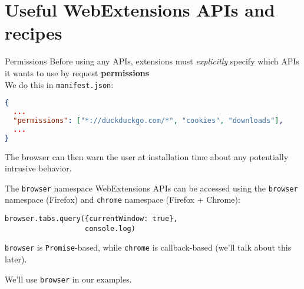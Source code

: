 \documentclass[../index.tex]{subfiles}
\begin{document}

\renewcommand{\sectiontitle}{Useful WebExtensions APIs and recipes}
\section{\sectiontitle}


\renewcommand{\currenttitle}{Permissions}
\begin{frame}[fragile]{\currenttitle}
  Before using any APIs, extensions must \textit{explicitly} specify which APIs
  it wants to use by request \textbf{permissions}\footnotemark \\[1em]

  We do this in \texttt{manifest.json}:
  \begin{lstlisting}[language=json]
{
  ...
  "permissions": ["*://duckduckgo.com/*", "cookies", "downloads"],
  ...
}
  \end{lstlisting}

  The browser can then warn the user at installation time about any potentially
  intrusive behavior.

\end{frame}


\renewcommand{\currenttitle}{The \texttt{browser} namespace}
\begin{frame}[fragile]{\currenttitle}
  WebExtensions APIs\footnotemark{} can be accessed using the \texttt{browser} namespace
  (Firefox) and \texttt{chrome} namespace (Firefox + Chrome): \\[1em]

  \begin{lstlisting}[language=ES6,basicstyle=\ttfamily\small]
browser.tabs.query({currentWindow: true},
                   console.log)
  \end{lstlisting}

  \vspace*{1em}

  \texttt{browser} is \texttt{Promise}-based, while \texttt{chrome} is
  callback-based (we'll talk about this later).

  We'll use \texttt{browser} in our examples.

\end{frame}
\end{document}
